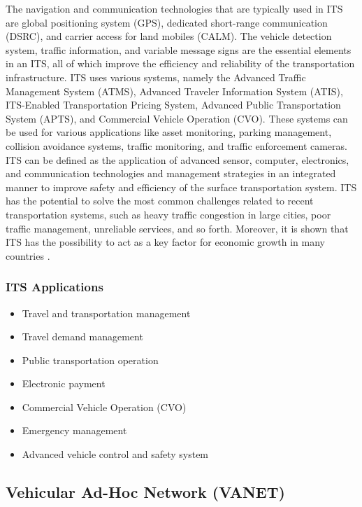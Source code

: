 			The navigation and communication technologies that are typically used in ITS are global positioning system (GPS), dedicated short-range communication (DSRC), and carrier access for land mobiles (CALM). The vehicle detection system, traffic information, and variable message signs are the essential elements in an ITS, all of which improve the efficiency and reliability of the transportation infrastructure. ITS uses various systems, namely the Advanced Traffic Management System (ATMS), Advanced Traveler Information System (ATIS), ITS-Enabled Transportation Pricing System, Advanced Public Transportation System (APTS), and Commercial Vehicle Operation (CVO). These systems can be used for various applications like asset monitoring, parking management, collision avoidance systems, traffic monitoring, and traffic enforcement cameras. \\
			ITS can be defined as the application of advanced sensor, computer, electronics, and communication technologies and management strategies in an integrated manner to improve safety and efficiency of the surface transportation system. ITS has the potential to solve the most common challenges related to recent transportation systems, such as heavy traffic congestion in large cities, poor traffic management, unreliable services, and so forth. Moreover, it is shown that ITS has the possibility to act as a key factor for economic growth in many countries \cite{buyya2016internet}. 
			
			\subsubsection{ITS Applications}
			\begin{itemize}
				\let\labelitemi\labelitemii
				\item Travel and transportation management
				\item Travel demand management
				\item Public transportation operation
				\item Electronic payment
				\item Commercial Vehicle Operation (CVO)
				\item Emergency management
				\item Advanced vehicle control and safety system
			\end{itemize}
			
			\subsection{Vehicular Ad-Hoc Network (VANET)}
